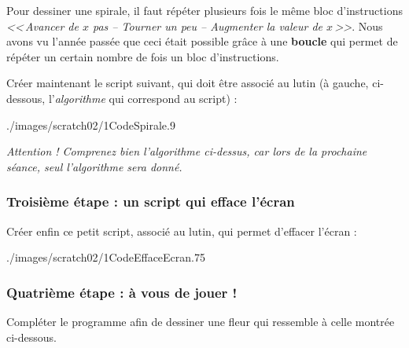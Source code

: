 Pour dessiner une spirale, il faut répéter plusieurs fois le même bloc d'instructions \emph{<<\,Avancer de $x$ pas -- Tourner un peu -- Augmenter la valeur de $x$\,>>}. Nous avons vu l'année passée que ceci était possible grâce à une \textbf{boucle} qui permet de répéter un certain nombre de fois un bloc d'instructions.


Créer maintenant le script suivant, qui doit être associé au lutin (à gauche, ci-dessous, l'\emph{algorithme} qui correspond au script) :

% 
              {./images/scratch02/1CodeSpirale}{.9\textwidth}  

\emph{Attention ! Comprenez bien l'algorithme ci-dessus, car lors de la prochaine séance, seul l'algorithme sera donné.} 

\subsubsection{Troisième étape : un script qui efface l'écran}

Créer enfin ce petit script, associé au lutin, qui permet d'effacer l'écran :

%
              {./images/scratch02/1CodeEffaceEcran}{.75\textwidth}


\subsubsection{Quatrième étape : à vous de jouer !}

Compléter le programme afin de dessiner une fleur qui ressemble à celle montrée ci-dessous.




